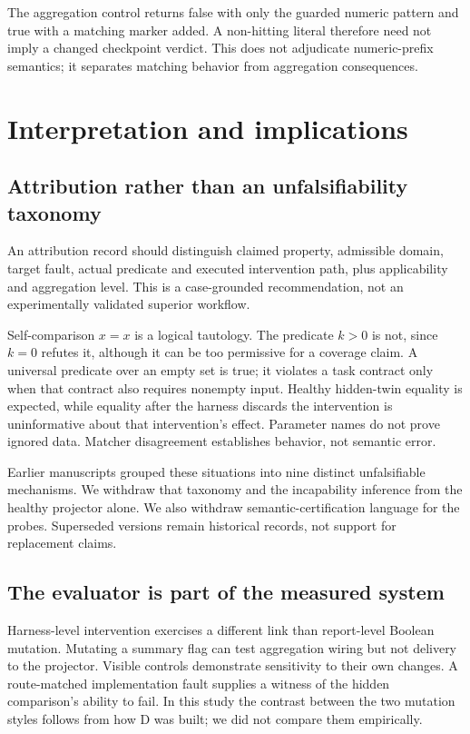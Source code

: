 \documentclass[11pt]{article}
\begin{document}
The aggregation control returns false with only the guarded numeric pattern and true with a matching marker added. A non-hitting literal therefore need not imply a changed checkpoint verdict. This does not adjudicate numeric-prefix semantics; it separates matching behavior from aggregation consequences.

\section{Interpretation and implications}
\subsection{Attribution rather than an unfalsifiability taxonomy}\label{sec:attribution}
An attribution record should distinguish claimed property, admissible domain, target fault, actual predicate and executed intervention path, plus applicability and aggregation level. This is a case-grounded recommendation, not an experimentally validated superior workflow.

Self-comparison \(x=x\) is a logical tautology. The predicate \(k>0\) is not, since \(k=0\) refutes it, although it can be too permissive for a coverage claim. A universal predicate over an empty set is true; it violates a task contract only when that contract also requires nonempty input. Healthy hidden-twin equality is expected, while equality after the harness discards the intervention is uninformative about that intervention's effect. Parameter names do not prove ignored data. Matcher disagreement establishes behavior, not semantic error.

Earlier manuscripts grouped these situations into nine distinct unfalsifiable mechanisms. We withdraw that taxonomy and the incapability inference from the healthy projector alone. We also withdraw semantic-certification language for the probes. Superseded versions remain historical records, not support for replacement claims.

\subsection{The evaluator is part of the measured system}
Harness-level intervention exercises a different link than report-level Boolean mutation. Mutating a summary flag can test aggregation wiring but not delivery to the projector. Visible controls demonstrate sensitivity to their own changes. A route-matched implementation fault supplies a witness of the hidden comparison's ability to fail. In this study the contrast between the two mutation styles follows from how D was built; we did not compare them empirically.
\end{document}
